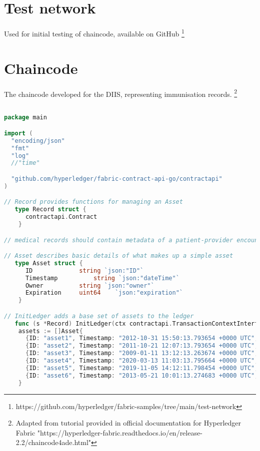 \section{Test network} Used for initial testing of chaincode, available on GitHub \footnote{https://github.com/hyperledger/fabric-samples/tree/main/test-network} \label{appendix:testnet}

\section{Chaincode} 
The chaincode developed for the DIIS, representing immunisation records. \footnote{Adapted from tutorial provided in official documentation for Hyperledger Fabric "https://hyperledger-fabric.readthedocs.io/en/release-2.2/chaincode4ade.html"}
\begin{lstlisting}[language=Go, caption={Chaincode representing immunisation records.}]

package main

import (
  "encoding/json"
  "fmt"
  "log"
  //"time"

  "github.com/hyperledger/fabric-contract-api-go/contractapi"
)

// Record provides functions for managing an Asset
   type Record struct {
      contractapi.Contract
    }

// medical records should contain metadata of a patient-provider encounter (visit date/time, location, etc.), 

// Asset describes basic details of what makes up a simple asset
   type Asset struct {
      ID             string `json:"ID"`
      Timestamp          string `json:"dateTime"`
      Owner          string `json:"owner"`
      Expiration     uint64    `json:"expiration"`
    }

// InitLedger adds a base set of assets to the ledger
   func (s *Record) InitLedger(ctx contractapi.TransactionContextInterface) error {
    assets := []Asset{
      {ID: "asset1", Timestamp: "2012-10-31 15:50:13.793654 +0000 UTC", Owner: "Tomoko", Expiration: 104467440737095516},
      {ID: "asset2", Timestamp: "2011-10-21 12:07:13.793654 +0000 UTC", Owner: "Brad", Expiration: 438579485745748},
      {ID: "asset3", Timestamp: "2009-01-11 13:12:13.263674 +0000 UTC", Owner: "Jin Soo", Expiration: 89273489237483},
      {ID: "asset4", Timestamp: "2020-03-13 11:03:13.795664 +0000 UTC", Owner: "Max", Expiration: 239048203894},
      {ID: "asset5", Timestamp: "2019-11-05 14:12:11.798454 +0000 UTC", Owner: "Adriana", Expiration: 9023423948333},
      {ID: "asset6", Timestamp: "2013-05-21 10:01:13.274683 +0000 UTC", Owner: "Michel", Expiration: 290378489237},
    }


\end{lstlisting}
